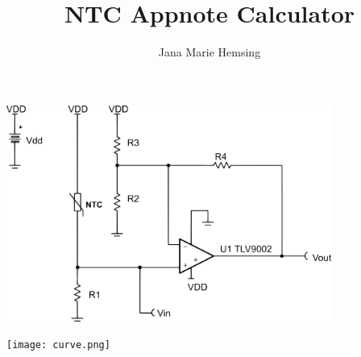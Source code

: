 \documentclass[paper=a4]{scrartcl}
\title{NTC Appnote Calculator}
\author{Jana Marie Hemsing}
\begin{document}
\maketitle

\begin{center}
  \includegraphics[width=0.8\textwidth]{schematic.png}
\end{center}



\begin{center}
  \texttt{[image: curve.png]}
\end{center}
\end{document}
